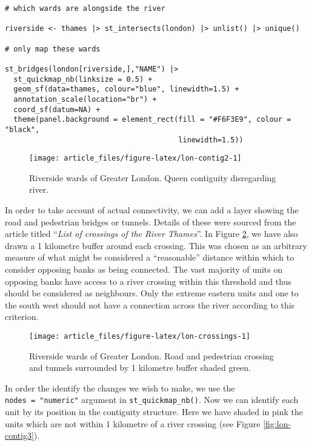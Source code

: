 \begin{verbatim}
# which wards are alongside the river

riverside <- thames |> st_intersects(london) |> unlist() |> unique()

# only map these wards

st_bridges(london[riverside,],"NAME") |> 
  st_quickmap_nb(linksize = 0.5) +
  geom_sf(data=thames, colour="blue", linewidth=1.5) + 
  annotation_scale(location="br") +
  coord_sf(datum=NA) + 
  theme(panel.background = element_rect(fill = "#F6F3E9", colour = "black", 
                                        linewidth=1.5))
\end{verbatim}

\begin{figure}

{\centering \texttt{[image: article\_files/figure-latex/lon-contig2-1]} 

}

\caption{Riverside wards of Greater London. Queen contiguity disregarding river. }\label{fig:lon-contig2}
\end{figure}

In order to take account of actual connectivity, we can add a layer showing the road and pedestrian bridges or tunnels. Details of these were sourced from the \citet{wikicrossings} article titled ``\emph{List of crossings of the River Thames}''. In Figure \ref{fig:lon-crossings}, we have also drawn a 1 kilometre buffer around each crossing. This was chosen as an arbitrary measure of what might be considered a ``reasonable'' distance within which to consider opposing banks as being connected. The vast majority of units on opposing banks have access to a river crossing within this threshold and thus should be considered as neighbours. Only the extreme eastern units and one to the south west should not have a connection across the river according to this criterion.

\begin{figure}

{\centering \texttt{[image: article\_files/figure-latex/lon-crossings-1]} 

}

\caption{Riverside wards of Greater London. Road and pedestrian crossing and tunnels surrounded by 1 kilometre buffer shaded green. }\label{fig:lon-crossings}
\end{figure}

In order the identify the changes we wish to make, we use the
\texttt{nodes\ =\ "numeric"} argument in \texttt{st\_quickmap\_nb()}. Now we can identify
each unit by its position in the contiguity structure. Here we have
shaded in pink the units which are not within 1 kilometre of a river
crossing (see Figure \ref{fig:lon-contig3}).

